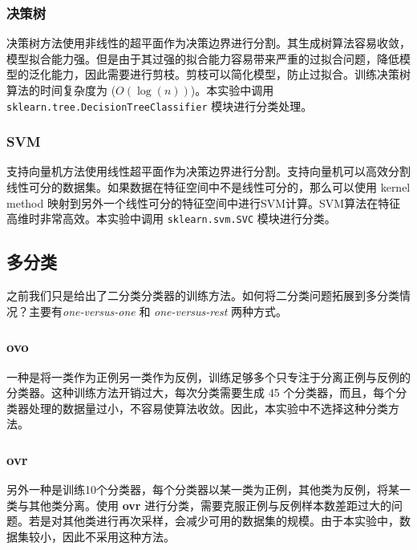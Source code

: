 \hypertarget{ux51b3ux7b56ux6811}{%
\subsubsection{决策树}\label{ux51b3ux7b56ux6811}}

决策树方法使用非线性的超平面作为决策边界进行分割。其生成树算法容易收敛，模型拟合能力强。但是由于其过强的拟合能力容易带来严重的过拟合问题，降低模型的泛化能力，因此需要进行剪枝。剪枝可以简化模型，防止过拟合。训练决策树算法的时间复杂度为
(\(O(\log(n))\))。本实验中调用
\texttt{sklearn.tree.DecisionTreeClassifier} 模块进行分类处理。

\hypertarget{svm}{%
\subsubsection{SVM}\label{svm}}

支持向量机方法使用线性超平面作为决策边界进行分割。支持向量机可以高效分割线性可分的数据集。如果数据在特征空间中不是线性可分的，那么可以使用
kernel method
映射到另外一个线性可分的特征空间中进行SVM计算。SVM算法在特征高维时非常高效。本实验中调用
\texttt{sklearn.svm.SVC} 模块进行分类。

\hypertarget{ux591aux5206ux7c7b}{%
\subsection{多分类}\label{ux591aux5206ux7c7b}}

之前我们只是给出了二分类分类器的训练方法。如何将二分类问题拓展到多分类情况？主要有\emph{one-versus-one}
和 \emph{one-versus-rest} 两种方式。

\hypertarget{ovo}{%
\subsubsection{ovo}\label{ovo}}

一种是将一类作为正例另一类作为反例，训练足够多个只专注于分离正例与反例的分类器。这种训练方法开销过大，每次分类需要生成
45
个分类器，而且，每个分类器处理的数据量过小，不容易使算法收敛。因此，本实验中不选择这种分类方法。

\hypertarget{ovr}{%
\subsubsection{ovr}\label{ovr}}

另外一种是训练10个分类器，每个分类器以某一类为正例，其他类为反例，将某一类与其他类分离。使用
\textbf{ovr}
进行分类，需要克服正例与反例样本数差距过大的问题。若是对其他类进行再次采样，会减少可用的数据集的规模。由于本实验中，数据集较小，因此不采用这种方法。

